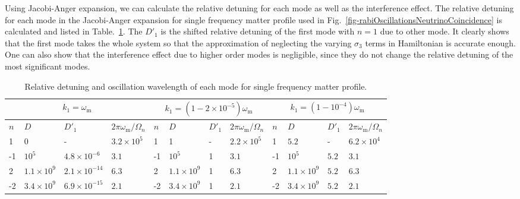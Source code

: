 \documentclass[%
reprint,
 amsmath,amssymb,
 prd,
]{revtex4-1}
\newcommand{\RD}{D}
\begin{document}
Using Jacobi-Anger expansion, we can calculate the relative detuning for each mode as well as the interference effect. The relative detuning for each mode in the Jacobi-Anger expansion for single frequency matter profile used in Fig.~\ref{fig-rabiOscillationsNeutrinoCoincidence} is calculated and listed in Table.~\ref{tab-q-values-single-frequency-example}. The $\RD'_1$ is the shifted relative detuning of the first mode with $n=1$ due to other mode. It clearly shows that the first mode takes the whole system so that the approximation of neglecting the varying $\sigma_3$ terms in Hamiltonian is accurate enough. One can also show that the interference effect due to higher order modes is negligible, since they do not change the relative detuning of the most significant modes.






\begin{table}
\caption{\label{tab-q-values-single-frequency-example}Relative detuning and oscillation wavelength of each mode for single frequency matter profile.}
\begin{ruledtabular}
\begin{tabular}{llll|llll|llll}
 \multicolumn{4}{c|}{$k_1=\omega_{\mathrm m}$} & \multicolumn{4}{c|}{$k_1=(1-2\times 10^{-5})\omega_{\mathrm{m}}$} & \multicolumn{4}{c}{$k_1=(1-10^{-4})\omega_{\mathrm m}$} \\
\hline
   $n$ & $\RD$ & $\RD'_1$  & $2\pi\omega_{\mathrm m}/\Omega_n$ & $n$ & $\RD$ & $\RD'_1$ & $2\pi\omega_{\mathrm m}/\Omega_n$ & $n$ & $\RD$ & $\RD'_1$ & $2\pi\omega_{\mathrm m}/\Omega_n$  \\
\hline
 1 &	0  & - &   $3.2\times10^5$   & 1 &	1 &  -  &   $2.2\times 10^5$       & 1   &	$5.2$ &  - & $6.2\times10^4$   \\
-1 &	$10^5$ &  $4.8\times 10^{-6}$  &   $3.1$     &     -1 &	$10^5$ &   1  &   $3.1$               &  -1 &	$10^5$  & $5.2$ & $3.1$  \\
2 &	$1.1\times 10^9$  &   $2.1\times 10^{-14}$  &   $6.3$    &  2 & 	$1.1\times 10^9$ &  1  &    $6.3$   &  2  &	$1.1\times 10^9$  &  $5.2$  & $6.3$  \\
-2 &	$3.4\times 10^9$  & $6.9\times 10^{-15}$ & $2.1$ &    -2 &	$3.4\times10^9$ &  1  &  $2.1$          & -2  &	$3.4\times 10^9$ & $5.2$ &  $2.1$  \\
\end{tabular}
\end{ruledtabular}
\end{table}
\end{document}
